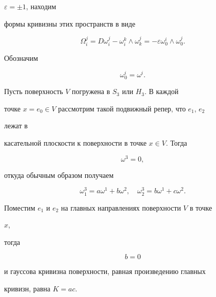 $\varepsilon=\pm1$, находим 


формы кривизны этих пространств в виде 


$$ 


\Omega^j_i=D\omega^j_i-\omega^k_i\wedge\omega^j_k= 


-\varepsilon\omega^i_0\wedge\omega^j_0. 


$$ 


Обозначим 


\begin{equation} 


\omega^i_0=\omega^i. 


\end{equation} 


 


Пусть поверхность $V$ погружена в $S_3$ или $H_3$. В каждой 


точке $x=e_0\in V$ рассмотрим такой подвижный репер, что $e_1$, $e_2$ 


лежат в 


касательной плоскости к поверхности в точке $x\in V$. Тогда 


\begin{equation} 


\omega^3=0, 


\end{equation} 


откуда обычным образом получаем 


\begin{equation} 


\omega^3_1=a\omega^1+b\omega^2,\quad 


\omega^3_2=b\omega^1+c\omega^2. 


\end{equation} 


Поместим $e_1$ и $e_2$ на главных направлениях поверхности $V$ в точке 


$x$, 


тогда 


\begin{equation} 


b=0 


\end{equation} 


и гауссова кривизна поверхности, равная произведению главных 


кривизн, равна $K=a c$. 


\medskip 


 



